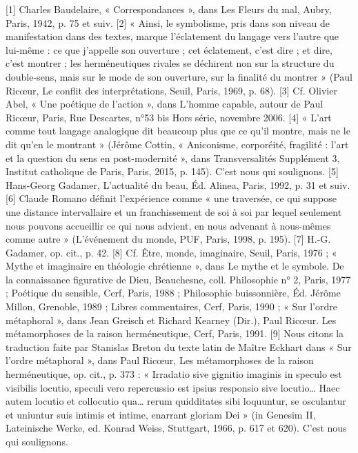     [1]
    Charles Baudelaire, « Correspondances », dans Les Fleurs du mal, Aubry, Paris, 1942, p. 75 et suiv.
    [2]
    « Ainsi, le symbolisme, pris dans son niveau de manifestation dans des textes, marque l’éclatement du langage vers l’autre que lui-même : ce que j’appelle son ouverture ; cet éclatement, c’est dire ; et dire, c’est montrer ; les herméneutiques rivales se déchirent non sur la structure du double-sens, mais sur le mode de son ouverture, sur la finalité du montrer » (Paul Ricœur, Le conflit des interprétations, Seuil, Paris, 1969, p. 68).
    [3]
    Cf. Olivier Abel, « Une poétique de l’action », dans L’homme capable, autour de Paul Ricœur, Paris, Rue Descartes, n°53 bis Hors série, novembre 2006.
    [4]
    « L’art comme tout langage analogique dit beaucoup plus que ce qu’il montre, mais ne le dit qu’en le montrant » (Jérôme Cottin, « Aniconisme, corporéité, fragilité : l’art et la question du sens en post-modernité », dans Transversalités Supplément 3, Institut catholique de Paris, Paris, 2015, p. 145). C’est nous qui soulignons.
    [5]
    Hans-Georg Gadamer, L’actualité du beau, Éd. Alinea, Paris, 1992, p. 31 et suiv.
    [6]
    Claude Romano définit l’expérience comme « une traversée, ce qui suppose une distance intervallaire et un franchissement de soi à soi par lequel seulement nous pouvons accueillir ce qui nous advient, en nous advenant à nous-mêmes comme autre » (L’événement du monde, PUF, Paris, 1998, p. 195).
    [7]
    H.-G. Gadamer, op. cit., p. 42.
    [8]
    Cf. Être, monde, imaginaire, Seuil, Paris, 1976 ; « Mythe et imaginaire en théologie chrétienne », dans Le mythe et le symbole. De la connaissance figurative de Dieu, Beauchesne, coll. Philosophie n° 2, Paris, 1977 ; Poétique du sensible, Cerf, Paris, 1988 ; Philosophie buissonnière, Éd. Jérôme Millon, Grenoble, 1989 ; Libres commentaires, Cerf, Paris, 1990 ; « Sur l’ordre métaphoral », dans Jean Greisch et Richard Kearney (Dir.), Paul Ricœur. Les métamorphoses de la raison herméneutique, Cerf, Paris, 1991.
    [9]
    Nous citons la traduction faite par Stanislas Breton du texte latin de Maître Eckhart dans « Sur l’ordre métaphoral », dans Paul Ricœur, Les métamorphoses de la raison herméneutique, op. cit., p. 373 : « Irradatio sive gignitio imaginis in speculo est visibilis locutio, speculi vero repercussio est ipsius responsio sive locutio… Haec autem locutio et collocutio qua… rerum quidditates sibi loquuntur, se osculantur et uniuntur suis intimis et intime, enarrant gloriam Dei » (in Genesim II, Lateinische Werke, ed. Konrad Weiss, Stuttgart, 1966, p. 617 et 620). C’est nous qui soulignons.
